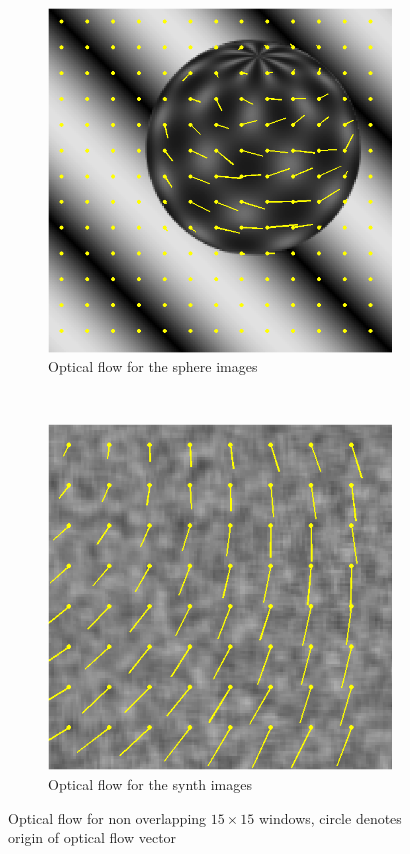 \documentclass[a4paper,10pt]{article}
\begin{document}
\begin{figure}[h!tb]

        \centering
        \begin{subfigure}{0.475\textwidth}
                \centering
                \includegraphics[width=\textwidth]{sphere}
                \caption{Optical flow for the sphere images}
        \end{subfigure}
        ~
        \begin{subfigure}{0.475\textwidth}
                \centering
                \includegraphics[width=\textwidth]{synth}
                \caption{Optical flow for the synth images}
        \end{subfigure}
\caption{Optical flow for non overlapping $15\times15$ windows, circle denotes origin of optical flow vector}
\label{fig:opflow}      
\end{figure}
\end{document}
